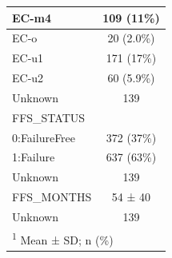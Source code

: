 \documentclass[
]{article}
\begin{document}
\begin{longtable}{l|c}
\hline
\hspace{1em}EC-m4 & 109 (11\%)\\
\hline
\hspace{1em}EC-o & 20 (2.0\%)\\
\hline
\hspace{1em}EC-u1 & 171 (17\%)\\
\hline
\hspace{1em}EC-u2 & 60 (5.9\%)\\
\hline
\hspace{1em}Unknown & \vphantom{2} 139\\
\hline
FFS\_STATUS & \\
\hline
\hspace{1em}0:FailureFree & 372 (37\%)\\
\hline
\hspace{1em}1:Failure & 637 (63\%)\\
\hline
\hspace{1em}Unknown & \vphantom{1} 139\\
\hline
FFS\_MONTHS & 54 ± 40\\
\hline
\hspace{1em}Unknown & 139\\
\hline
\multicolumn{2}{l}{\rule{0pt}{1em}\textsuperscript{1} Mean ± SD; n (\%)}\\
\end{longtable}
\end{document}
